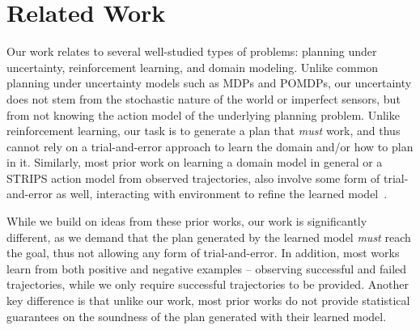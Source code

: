 \documentclass{article}
\begin{document}
	
	\section{Related Work}
	
	Our work relates to several well-studied types of problems: planning under uncertainty, reinforcement learning, and domain modeling. 
	Unlike common planning under uncertainty models such as MDPs and POMDPs, our uncertainty does not 
	stem from the stochastic nature of the world or imperfect sensors, but from  not knowing the action model of the underlying planning problem. Unlike reinforcement learning, our task is to generate a plan that {\em must} work, and thus cannot rely on a trial-and-error approach to learn the domain and/or how to plan in it. 
	Similarly, most prior work on learning a domain model in general or a STRIPS action model from observed trajectories, also involve some form of trial-and-error as well, interacting with environment to refine the learned model~\cite{mourao2012learning,wang1994learning,wang1994learning,walsh2008efficientLearning,levine2006explanation,jimenez2013integrating}. 
	
	
	While we build on ideas from these prior works, our work is significantly different, as we demand that  the plan generated by the learned model {\em must} reach the goal, thus not allowing any form of trial-and-error. 
	In addition, most works learn from both positive and negative examples -- observing successful and failed trajectories, while we only require successful trajectories to be provided. 
	Another key difference is that unlike our work, most prior works do not provide statistical guarantees on the soundness of the plan generated with their learned model. 
	
\end{document}
